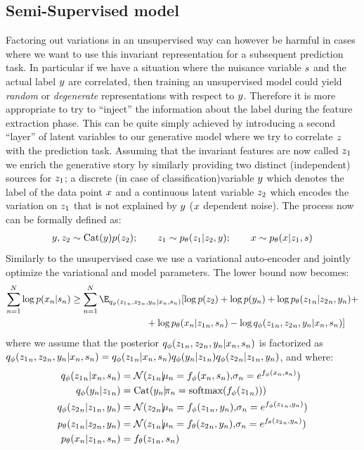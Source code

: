 \subsection{Semi-Supervised model}
Factoring out variations in an unsupervised way can however be harmful in cases where we want to use this invariant representation for a subsequent prediction task. In particular if we have a situation where the nuisance variable $\*s$ and the actual label $\*y$ are correlated, then training an unsupervised model could yield \emph{random} or \emph{degenerate} representations with respect to $\*y$. Therefore it is more appropriate to try to ``inject'' the information about the label during the feature extraction phase. This can be quite simply achieved by introducing a second ``layer'' of latent variables to our generative model where we try to correlate $\*z$ with the prediction task. Assuming that the invariant features are now called $\*z_1$ we enrich the generative story by similarly providing two distinct (independent) sources for $\*z_1$; a discrete (in case of classification)variable $\*y$ which denotes the label of the data point $\*x$ and a continuous latent variable $\*z_2$ which encodes the variation on $\*z_1$ that is not explained by $\*y$ ($\*x$ dependent noise). The process now can be formally defined as: 
\begin{align*}
\*y, \*z_2 \sim \text{Cat}(\*y)p(\*z_2); \qquad  \*z_1 \sim p_\theta(\*z_1|\*z_2, \*y);\qquad \*x \sim p_\theta(\*x| \*z_1,\*s)\nonumber
\end{align*}   
Similarly to the unsupervised case we use a variational auto-encoder and jointly optimize the variational and model parameters. The lower bound now becomes:
\begin{align}
\sum_{n=1}^{N}\log p(\*x_n|\*s_n) & \ge \sum_{n=1}^{N}\E_{q_\phi({\*z_1}_n, {\*z_2}_n, \*y_n| \*x_n, \*s_n)}[\log p(\*z_2) + \log p(\*y_n) + \log p_\theta({\*z_1}_n|{\*z_2}_n, \*y_n) + \nonumber\\&\qquad\qquad\qquad\qquad + \log p_\theta(\*x_n|{\*z_1}_n,\*s_n) - \log q_\phi({\*z_1}_n, {\*z_2}_n, \*y_n|\*x_n, \*s_n)]  
\end{align}
where we assume that the posterior $q_\phi({\*z_1}_n, {\*z_2}_n, \*y_n|\*x_n, \*s_n)$ is factorized as $q_\phi({\*z_1}_n, {\*z_2}_n, \*y_n|\*x_n, \*s_n) = q_\phi({\*z_1}_n|\*x_n, \*s_n)q_\phi(\*y_n|{\*z_1}_n)q_\phi({\*z_2}_n|{\*z_1}_n,\*y_n)$, and where:
\begin{align*}
q_\phi({\*z_1}_n|\*x_n, \*s_n) & = \mathcal{N}({\*z_1}_n|\!\mu_n = f_\phi(\*x_n, \*s_n), \!\sigma_n = e^{f_\phi(\*x_n, \*s_n)}) \\
q_\phi(\*y_n | {\*z_1}_n) & = \text{Cat}(\*y_n|\!\pi_n = \text{softmax}(f_\phi({\*z_1}_n)))\\
q_\phi({\*z_2}_n|{\*z_1}_n, \*y_n) & = \mathcal{N}({\*z_2}_n| \!\mu_n = f_\phi({\*z_1}_n, \*y_n), \!\sigma_n = e^{f_\phi({\*z_1}_n, \*y_n)})\\
p_\theta({\*z_1}_n | {\*z_2}_n, \*y_n) & = \mathcal{N}({\*z_1}_n| \!\mu_n = f_\theta({\*z_2}_n, \*y_n), \!\sigma_n = e^{f_\theta({\*z_2}_n, \*y_n)})\\
p_\theta(\*x_n|{\*z_1}_n, \*s_n) & = f_\theta({\*z_1}_n, \*s_n)
\end{align*}
